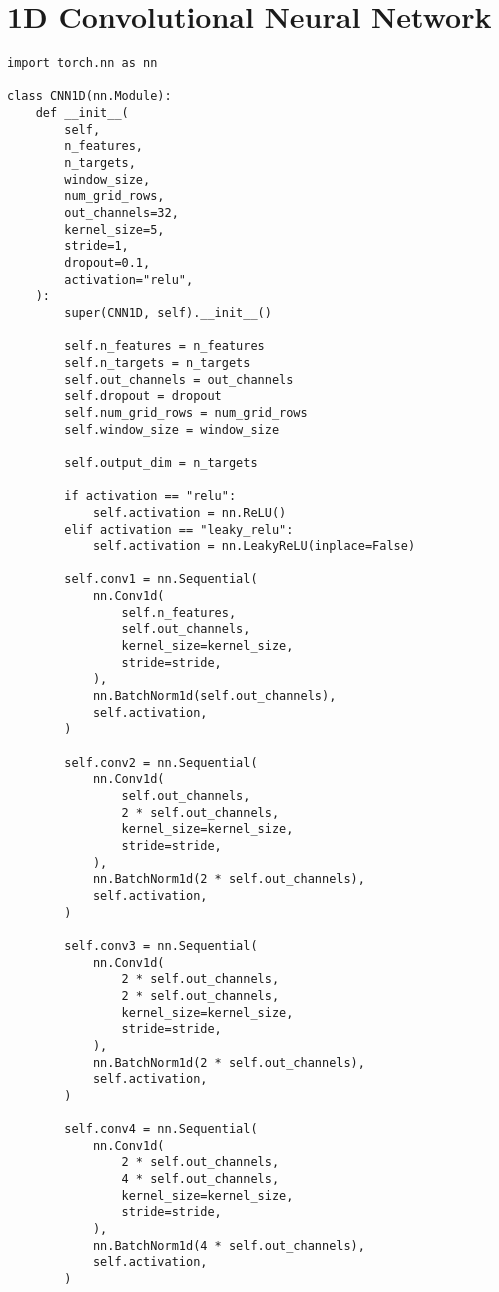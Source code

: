 \documentclass[
thesis  %
]{csthes}
\begin{document}
\section{1D Convolutional Neural Network}
\begin{lstlisting}
import torch.nn as nn

class CNN1D(nn.Module):
    def __init__(
        self,
        n_features,
        n_targets,
        window_size,
        num_grid_rows,
        out_channels=32,
        kernel_size=5,
        stride=1,
        dropout=0.1,
        activation="relu",
    ):
        super(CNN1D, self).__init__()

        self.n_features = n_features
        self.n_targets = n_targets
        self.out_channels = out_channels
        self.dropout = dropout
        self.num_grid_rows = num_grid_rows
        self.window_size = window_size

        self.output_dim = n_targets

        if activation == "relu":
            self.activation = nn.ReLU()
        elif activation == "leaky_relu":
            self.activation = nn.LeakyReLU(inplace=False)

        self.conv1 = nn.Sequential(
            nn.Conv1d(
                self.n_features,
                self.out_channels,
                kernel_size=kernel_size,
                stride=stride,
            ),
            nn.BatchNorm1d(self.out_channels),
            self.activation,
        )

        self.conv2 = nn.Sequential(
            nn.Conv1d(
                self.out_channels,
                2 * self.out_channels,
                kernel_size=kernel_size,
                stride=stride,
            ),
            nn.BatchNorm1d(2 * self.out_channels),
            self.activation,
        )

        self.conv3 = nn.Sequential(
            nn.Conv1d(
                2 * self.out_channels,
                2 * self.out_channels,
                kernel_size=kernel_size,
                stride=stride,
            ),
            nn.BatchNorm1d(2 * self.out_channels),
            self.activation,
        )

        self.conv4 = nn.Sequential(
            nn.Conv1d(
                2 * self.out_channels,
                4 * self.out_channels,
                kernel_size=kernel_size,
                stride=stride,
            ),
            nn.BatchNorm1d(4 * self.out_channels),
            self.activation,
        )


\end{lstlisting}
\end{document}
